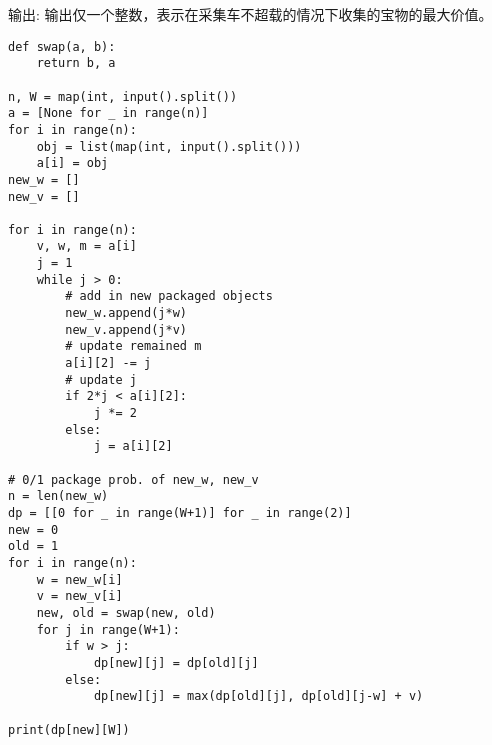 \documentclass[../main]{subfiles}
\begin{document}
\begin{sloppy}
输出: 输出仅一个整数，表示在采集车不超载的情况下收集的宝物的最大价值。

\begin{lstlisting}[style = Python]
def swap(a, b):
    return b, a

n, W = map(int, input().split())
a = [None for _ in range(n)]
for i in range(n):
    obj = list(map(int, input().split()))
    a[i] = obj
new_w = []
new_v = []

for i in range(n):
    v, w, m = a[i]
    j = 1
    while j > 0:
        # add in new packaged objects
        new_w.append(j*w)
        new_v.append(j*v)
        # update remained m
        a[i][2] -= j
        # update j
        if 2*j < a[i][2]:
            j *= 2
        else:
            j = a[i][2]
            
# 0/1 package prob. of new_w, new_v
n = len(new_w)
dp = [[0 for _ in range(W+1)] for _ in range(2)]
new = 0
old = 1
for i in range(n):
    w = new_w[i]
    v = new_v[i]
    new, old = swap(new, old)
    for j in range(W+1):
        if w > j:
            dp[new][j] = dp[old][j]
        else:
            dp[new][j] = max(dp[old][j], dp[old][j-w] + v)
            
print(dp[new][W])
\end{lstlisting}

\end{sloppy}
\end{document}
